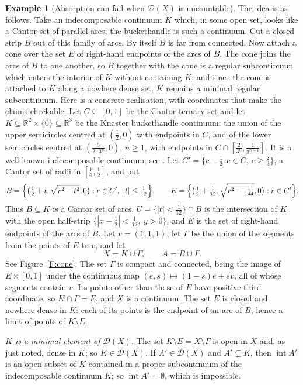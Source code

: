\documentclass[11pt,reqno]{amsart}
\theoremstyle{plain}
\theoremstyle{definition}
\newtheorem{example}[theorem]{Example}
\theoremstyle{remark}
\newcommand{\D}{\mathcal{D}}
\newcommand{\intr}{\operatorname{int}}
\newcommand{\R}{\mathbb{R}}
\begin{document}
\begin{example}[Absorption can fail when $\D(X)$ is uncountable]\label{E:cone}
The idea is as follows. Take an indecomposable continuum $K$ which, in some open set, looks like a Cantor set of parallel arcs; the buckethandle is such a continuum. Cut a closed strip $B$ out of this family of arcs. By itself $B$ is far from connected. Now attach a cone over the set $E$ of right-hand endpoints of the arcs of $B$. The cone joins the arcs of $B$ to one another, so $B$ together with the cone is a regular subcontinuum which enters the interior of $K$ without containing $K$; and since the cone is attached to $K$ along a nowhere dense set, $K$ remains a minimal regular subcontinuum. Here is a concrete realisation, with coordinates that make the claims checkable. Let $C\subseteq[0,1]$ be the Cantor ternary set and let $K\subseteq\R^2\times\{0\}\subseteq\R^3$ be the Knaster buckethandle continuum: the union of the upper semicircles centred at $(\tfrac12,0)$ with endpoints in $C$, and of the lower semicircles centred at $(\tfrac{5}{2\cdot3^{n}},0)$, $n\ge1$, with endpoints in $C\cap[\tfrac{2}{3^{n}},\tfrac{1}{3^{n-1}}]$. It is a well-known indecomposable continuum; see \cite{Nadler}. Let $C'=\{c-\tfrac12:c\in C,\ c\ge\tfrac23\}$, a Cantor set of radii in $[\tfrac16,\tfrac12]$, and put
\[
B=\Bigl\{\bigl(\tfrac12+t,\sqrt{r^2-t^2},0\bigr):r\in C',\ |t|\le\tfrac1{12}\Bigr\},\qquad
E=\Bigl\{\bigl(\tfrac12+\tfrac1{12},\sqrt{r^2-\tfrac1{144}},0\bigr):r\in C'\Bigr\}.
\]
Thus $B\subseteq K$ is a Cantor set of arcs, $U=\{|t|<\tfrac1{12}\}\cap B$ is the intersection of $K$ with the open half-strip $\{|x-\tfrac12|<\tfrac1{12},\ y>0\}$, and $E$ is the set of right-hand endpoints of the arcs of $B$. Let $v=(1,1,1)$, let $\Gamma$ be the union of the segments from the points of $E$ to $v$, and let
\[
X=K\cup\Gamma,\qquad A=B\cup\Gamma .
\]
See Figure~\ref{F:cone}. The set $\Gamma$ is compact and connected, being the image of $E\times[0,1]$ under the continuous map $(e,s)\mapsto(1-s)e+sv$, all of whose segments contain $v$. Its points other than those of $E$ have positive third coordinate, so $K\cap\Gamma=E$, and $X$ is a continuum. The set $E$ is closed and nowhere dense in $K$: each of its points is the endpoint of an arc of $B$, hence a limit of points of $K\setminus E$.

\emph{$K$ is a minimal element of $\D(X)$.} The set $K\setminus E=X\setminus\Gamma$ is open in $X$ and, as just noted, dense in $K$; so $K\in\D(X)$. If $A'\in\D(X)$ and $A'\subsetneq K$, then $\intr A'$ is an open subset of $K$ contained in a proper subcontinuum of the indecomposable continuum $K$; so $\intr A'=\emptyset$, which is impossible.


\end{example}
\end{document}
